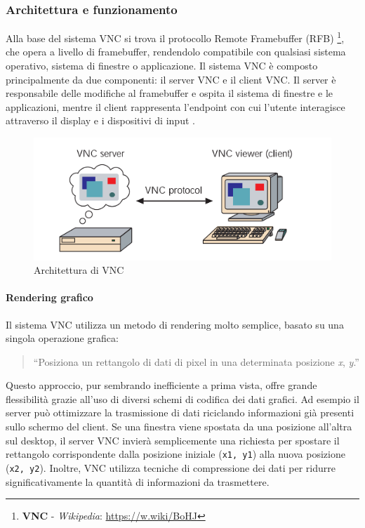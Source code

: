 \documentclass[12pt,a4paper,openright,twoside]{book}
\begin{document}
\subsubsection{Architettura e funzionamento}
Alla base del sistema \ac{VNC} si trova il protocollo Remote Framebuffer (RFB)
\footnote{\textbf{\ac{VNC}} - \emph{Wikipedia}: \url{https://w.wiki/BoHJ}},
che opera a livello di framebuffer,
rendendolo compatibile con qualsiasi sistema operativo,
sistema di finestre o applicazione.
%
Il sistema \ac{VNC} è composto principalmente da due componenti:
il server \ac{VNC} e il client \ac{VNC}.
%
Il server è responsabile delle modifiche al framebuffer e ospita il sistema di finestre e le applicazioni,
mentre il client rappresenta l'endpoint con cui l'utente interagisce attraverso il display e i dispositivi di input \cite{richardson1998vnc}.

\begin{figure}
    \centering
    \includegraphics[width=.6\linewidth]{figures/VNC architecture.png}
    \caption[xarch]{Architettura di \ac{VNC} \cite{richardson1998vnc}}
\end{figure}

\paragraph{Rendering grafico}
Il sistema \ac{VNC} utilizza un metodo di rendering molto semplice, basato su una singola operazione grafica:
\begin{quote}
    ``Posiziona un rettangolo di dati di pixel in una determinata posizione \emph{x}, \emph{y}.''
\end{quote}
Questo approccio, pur sembrando inefficiente a prima vista, offre grande flessibilità grazie all'uso di diversi schemi di codifica dei dati grafici.
%
Ad esempio il server può ottimizzare la trasmissione di dati riciclando informazioni già presenti sullo schermo del client.
%
Se una finestra viene spostata da una posizione all'altra sul desktop,
il server \ac{VNC} invierà semplicemente una richiesta per spostare il rettangolo corrispondente dalla posizione iniziale (\texttt{x1, y1}) alla nuova posizione (\texttt{x2, y2}).
%
Inoltre, \ac{VNC} utilizza tecniche di compressione dei dati per ridurre significativamente la quantità di informazioni da trasmettere.
\end{document}
